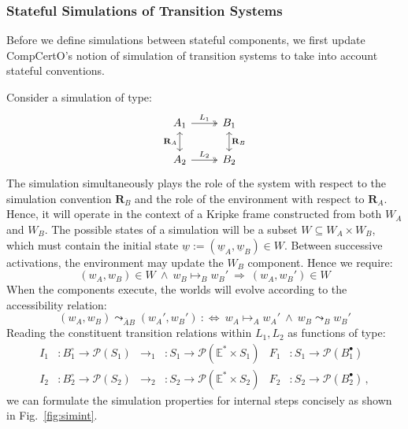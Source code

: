\documentclass[acmsmall,screen,review,anonymous]{acmart}
\newcommand{\que}{\circ}
\newcommand{\ans}{\bullet}
\newcommand{\intl}[1]{\underline{#1}}
\begin{document}

\subsubsection{Stateful Simulations of Transition Systems} %

Before we define simulations between stateful components,
we first update CompCertO's notion of simulation of transition systems
to take into account stateful conventions.

Consider a simulation of type:
\[
\begin{tikzcd}
  A_1 \ar[r, twoheadrightarrow, "L_1"] \ar[d, leftrightarrow, "\mathbf{R}_A"'] &
  B_1 \ar[d, leftrightarrow, "\mathbf{R}_B"] \\
  A_2 \ar[r, twoheadrightarrow, "L_2"] & B_2
\end{tikzcd}
\]
The simulation simultaneously
plays the role of the system with respect to
the simulation convention $\mathbf{R}_B$ and
the role of the environment with respect to $\mathbf{R}_A$.
Hence,
it will operate in the context of a Kripke frame
constructed from both $W_A$ and $W_B$.
The possible states of a simulation will be a subset
$W \subseteq W_A \times W_B$,
which must contain
the initial state $\intl{w} := (\intl{w}_A, \intl{w}_B) \in W$.
Between successive activations,
the environment may update the $W_B$ component.
Hence we require:
\[
  (w_A, w_B) \in W \:\wedge\:
  w_B \mapsto_B w_B' \:\Rightarrow\:
  (w_A, w_B') \in W
\]
When the components execute,
the worlds will evolve according to
the accessibility relation:
\[
  (w_A, w_B) \leadsto_{\bar{A}B} (w_A', w_B') \::\Leftrightarrow\:
  w_A \mapsto_A w_A' \:\wedge\: w_B \leadsto_B w_B'
\]
Reading the constituent transition relations
within $L_1, L_2$ as functions of type:
\begin{align*}
  I_1 &: B_1^\que \rightarrow \mathcal{P}(S_1) &
  {\rightarrow_1} &: S_1 \rightarrow \mathcal{P}(\mathbb{E}^* \times S_1) &
  F_1 &: S_1 \rightarrow \mathcal{P}(B_1^\ans)
  \\
  I_2 &: B_2^\que \rightarrow \mathcal{P}(S_2) &
  {\rightarrow_2} &: S_2 \rightarrow \mathcal{P}(\mathbb{E}^* \times S_2) &
  F_2 &: S_2 \rightarrow \mathcal{P}(B_2^\ans)
  \,,
\end{align*}
we can formulate the simulation properties for internal steps
concisely as shown in Fig.~\ref{fig:simint}.
\end{document}
